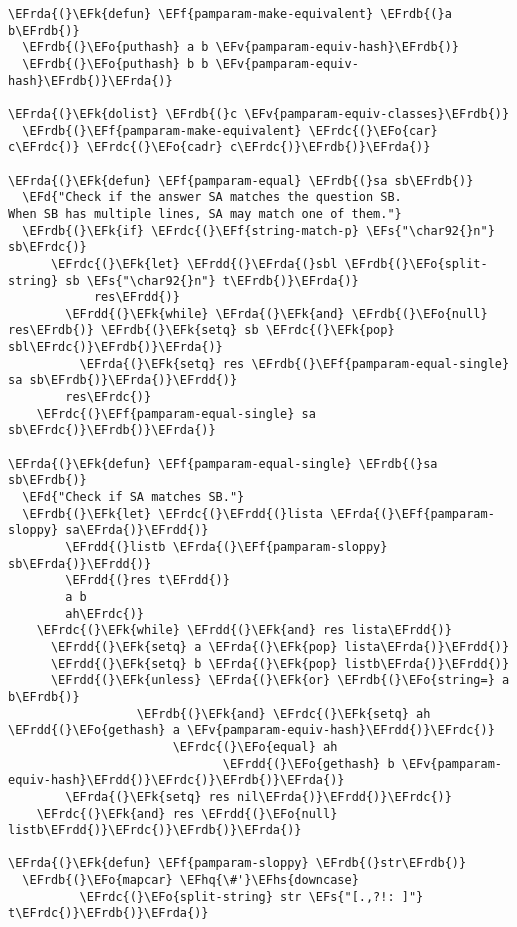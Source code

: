 \documentclass[a4wide,10pt]{article}
\newcommand{\EFs}[1]{\textcolor{EFs}{#1}} %
\newcommand{\EFd}[1]{\textcolor{EFd}{#1}} %
\newcommand{\EFk}[1]{\textcolor{EFk}{#1}} %
\newcommand{\EFf}[1]{\textcolor{EFf}{#1}} %
\newcommand{\EFv}[1]{\textcolor{EFv}{#1}} %
\newcommand{\EFo}[1]{\textcolor{EFo}{#1}} %
\newcommand{\EFhq}[1]{\textcolor{EFhq}{#1}} %
\newcommand{\EFhs}[1]{\textcolor{EFhs}{#1}} %
\newcommand{\EFrda}[1]{\textcolor{EFrda}{#1}} %
\newcommand{\EFrdb}[1]{\textcolor{EFrdb}{#1}} %
\newcommand{\EFrdc}[1]{\textcolor{EFrdc}{#1}} %
\newcommand{\EFrdd}[1]{\textcolor{EFrdd}{#1}} %
\begin{document}
\begin{Code}
\begin{Verbatim}
\EFrda{(}\EFk{defun} \EFf{pamparam-make-equivalent} \EFrdb{(}a b\EFrdb{)}
  \EFrdb{(}\EFo{puthash} a b \EFv{pamparam-equiv-hash}\EFrdb{)}
  \EFrdb{(}\EFo{puthash} b b \EFv{pamparam-equiv-hash}\EFrdb{)}\EFrda{)}

\EFrda{(}\EFk{dolist} \EFrdb{(}c \EFv{pamparam-equiv-classes}\EFrdb{)}
  \EFrdb{(}\EFf{pamparam-make-equivalent} \EFrdc{(}\EFo{car} c\EFrdc{)} \EFrdc{(}\EFo{cadr} c\EFrdc{)}\EFrdb{)}\EFrda{)}

\EFrda{(}\EFk{defun} \EFf{pamparam-equal} \EFrdb{(}sa sb\EFrdb{)}
  \EFd{"Check if the answer SA matches the question SB.
When SB has multiple lines, SA may match one of them."}
  \EFrdb{(}\EFk{if} \EFrdc{(}\EFf{string-match-p} \EFs{"\char92{}n"} sb\EFrdc{)}
      \EFrdc{(}\EFk{let} \EFrdd{(}\EFrda{(}sbl \EFrdb{(}\EFo{split-string} sb \EFs{"\char92{}n"} t\EFrdb{)}\EFrda{)}
            res\EFrdd{)}
        \EFrdd{(}\EFk{while} \EFrda{(}\EFk{and} \EFrdb{(}\EFo{null} res\EFrdb{)} \EFrdb{(}\EFk{setq} sb \EFrdc{(}\EFk{pop} sbl\EFrdc{)}\EFrdb{)}\EFrda{)}
          \EFrda{(}\EFk{setq} res \EFrdb{(}\EFf{pamparam-equal-single} sa sb\EFrdb{)}\EFrda{)}\EFrdd{)}
        res\EFrdc{)}
    \EFrdc{(}\EFf{pamparam-equal-single} sa sb\EFrdc{)}\EFrdb{)}\EFrda{)}

\EFrda{(}\EFk{defun} \EFf{pamparam-equal-single} \EFrdb{(}sa sb\EFrdb{)}
  \EFd{"Check if SA matches SB."}
  \EFrdb{(}\EFk{let} \EFrdc{(}\EFrdd{(}lista \EFrda{(}\EFf{pamparam-sloppy} sa\EFrda{)}\EFrdd{)}
        \EFrdd{(}listb \EFrda{(}\EFf{pamparam-sloppy} sb\EFrda{)}\EFrdd{)}
        \EFrdd{(}res t\EFrdd{)}
        a b
        ah\EFrdc{)}
    \EFrdc{(}\EFk{while} \EFrdd{(}\EFk{and} res lista\EFrdd{)}
      \EFrdd{(}\EFk{setq} a \EFrda{(}\EFk{pop} lista\EFrda{)}\EFrdd{)}
      \EFrdd{(}\EFk{setq} b \EFrda{(}\EFk{pop} listb\EFrda{)}\EFrdd{)}
      \EFrdd{(}\EFk{unless} \EFrda{(}\EFk{or} \EFrdb{(}\EFo{string=} a b\EFrdb{)}
                  \EFrdb{(}\EFk{and} \EFrdc{(}\EFk{setq} ah \EFrdd{(}\EFo{gethash} a \EFv{pamparam-equiv-hash}\EFrdd{)}\EFrdc{)}
                       \EFrdc{(}\EFo{equal} ah
                              \EFrdd{(}\EFo{gethash} b \EFv{pamparam-equiv-hash}\EFrdd{)}\EFrdc{)}\EFrdb{)}\EFrda{)}
        \EFrda{(}\EFk{setq} res nil\EFrda{)}\EFrdd{)}\EFrdc{)}
    \EFrdc{(}\EFk{and} res \EFrdd{(}\EFo{null} listb\EFrdd{)}\EFrdc{)}\EFrdb{)}\EFrda{)}

\EFrda{(}\EFk{defun} \EFf{pamparam-sloppy} \EFrdb{(}str\EFrdb{)}
  \EFrdb{(}\EFo{mapcar} \EFhq{\#'}\EFhs{downcase}
          \EFrdc{(}\EFo{split-string} str \EFs{"[.,?!: ]"} t\EFrdc{)}\EFrdb{)}\EFrda{)}


\end{Verbatim}
\end{Code}
\end{document}
